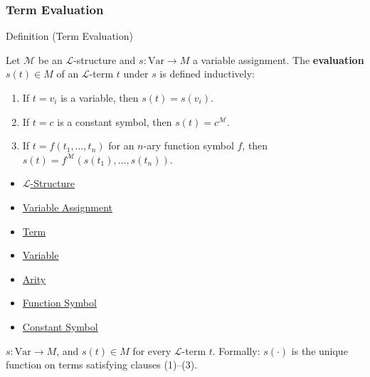 
\subsubsection*{Term Evaluation}

\begin{definitionbox}{Definition (Term Evaluation)}
\begin{definition}\label{def:term-evaluation}
Let $\mathcal{M}$ be an $\mathcal{L}$-structure and $s : \mathrm{Var} \to M$
a variable assignment.
The \textbf{evaluation} $s(t) \in M$ of an $\mathcal{L}$-term $t$ under
$s$ is defined inductively:
\begin{enumerate}
  \item If $t = v_i$ is a variable, then $s(t) = s(v_i)$.
  \item If $t = c$ is a constant symbol, then $s(t) = c^{\mathcal{M}}$.
  \item If $t = f(t_1, \ldots, t_n)$ for an $n$-ary function symbol $f$,
        then $s(t) = f^{\mathcal{M}}(s(t_1), \ldots, s(t_n))$.
\end{enumerate}
\end{definition}
\end{definitionbox}

\begin{dependencies}
\begin{itemize}
  \item \hyperref[def:l-structure]{$\mathcal{L}$-Structure}
  \item \hyperref[def:variable-assignment]{Variable Assignment}
  \item \hyperref[def:term]{Term}
  \item \hyperref[def:variable]{Variable}
  \item \hyperref[def:arity]{Arity}
  \item \hyperref[def:function-symbol]{Function Symbol}
  \item \hyperref[def:constant-symbol]{Constant Symbol}
\end{itemize}
\end{dependencies}

\begin{remark*}
$s : \mathrm{Var} \to M$, and $s(t) \in M$ for every $\mathcal{L}$-term $t$.
Formally: $s(\cdot)$ is the unique function on terms satisfying clauses (1)--(3).
\end{remark*}

